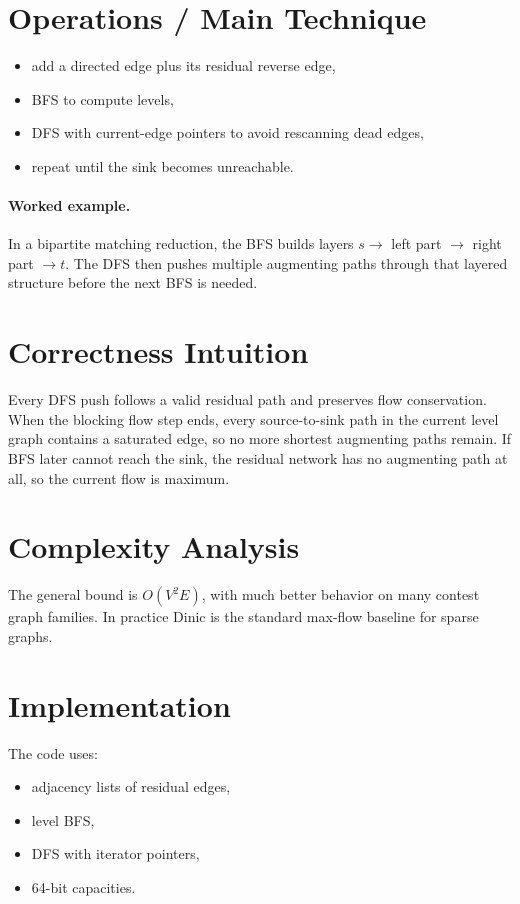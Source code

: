 \section*{Operations / Main Technique}

\begin{itemize}
  \item add a directed edge plus its residual reverse edge,
  \item BFS to compute levels,
  \item DFS with current-edge pointers to avoid rescanning dead edges,
  \item repeat until the sink becomes unreachable.
\end{itemize}

\paragraph{Worked example.}
In a bipartite matching reduction, the BFS builds layers \(s \to\) left part \(\to\) right part \(\to t\). The DFS
then pushes multiple augmenting paths through that layered structure before the next BFS is needed.

\section*{Correctness Intuition}

Every DFS push follows a valid residual path and preserves flow conservation. When the blocking flow step ends, every
source-to-sink path in the current level graph contains a saturated edge, so no more shortest augmenting paths remain.
If BFS later cannot reach the sink, the residual network has no augmenting path at all, so the current flow is maximum.

\section*{Complexity Analysis}

The general bound is \(O(V^2 E)\), with much better behavior on many contest graph families. In practice Dinic is the
standard max-flow baseline for sparse graphs.

\section*{Implementation}

The code uses:

\begin{itemize}
  \item adjacency lists of residual edges,
  \item level BFS,
  \item DFS with iterator pointers,
  \item 64-bit capacities.
\end{itemize}

